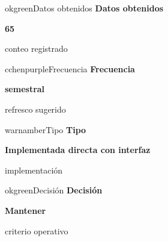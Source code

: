 \documentclass[9pt,a4paper]{extarticle}
\begin{document}
\vspace{0.04cm}
\begin{minipage}{0.24\textwidth}
\begin{metricbox}{okgreen}{Datos obtenidos}
{\large\bfseries Datos obtenidos}\par
{\Large\bfseries 65}\par
{\normalsize conteo registrado}
\end{metricbox}
\end{minipage}\hfill
\begin{minipage}{0.24\textwidth}
\begin{metricbox}{cchenpurple}{Frecuencia}
{\large\bfseries Frecuencia}\par
{\large\bfseries semestral}\par
{\normalsize refresco sugerido}
\end{metricbox}
\end{minipage}\hfill
\begin{minipage}{0.24\textwidth}
\begin{metricbox}{warnamber}{Tipo}
{\large\bfseries Tipo}\par
{\normalsize\bfseries Implementada directa con interfaz}\par
{\normalsize implementación}
\end{metricbox}
\end{minipage}\hfill
\begin{minipage}{0.24\textwidth}
\begin{metricbox}{okgreen}{Decisión}
{\large\bfseries Decisión}\par
{\normalsize\bfseries Mantener}\par
{\normalsize criterio operativo}
\end{metricbox}
\end{minipage}
\end{document}
